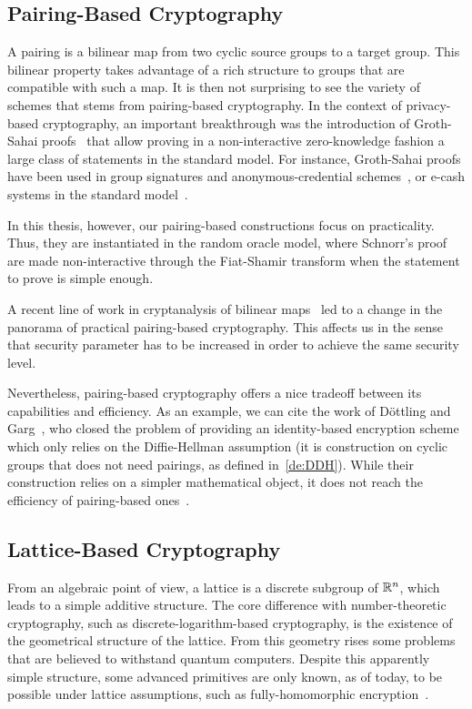 \subsection{Pairing-Based Cryptography}

A pairing is a bilinear map from two cyclic source groups to a target group.
This bilinear property takes advantage of a rich structure to groups that are compatible with such a map.
It is then not surprising to see the variety of schemes that stems from pairing-based cryptography.
In the context of privacy-based cryptography, an important breakthrough was the introduction of Groth-Sahai proofs~\cite{GOS06,GS08} that allow proving in a non-interactive zero-knowledge fashion a large class of statements in the standard model.
For instance, Groth-Sahai proofs have been used in group signatures and anonymous-credential schemes~\cite{Gro07,BCKL08,BCC+09}, or e-cash systems in the standard model~\cite{BCKL09}.

In this thesis, however, our pairing-based constructions focus on practicality.
Thus, they are instantiated in the random oracle model, where Schnorr's proof are made non-interactive through the Fiat-Shamir transform when the statement to prove is simple enough.

A recent line of work in cryptanalysis of bilinear maps~\cite{KB16,MSS17,BD18} led to a change in the panorama of practical pairing-based cryptography.
This affects us in the sense that security parameter has to be increased in order to achieve the same security level.

Nevertheless, pairing-based cryptography offers a nice tradeoff between its capabilities and efficiency.
As an example, we can cite the work of Döttling and Garg~\cite{DG17}, who closed the problem of providing an identity-based encryption scheme which only relies on the Diffie-Hellman assumption (it is construction on cyclic groups that does not need pairings, as defined in~\cref{de:DDH}).
While their construction relies on a simpler mathematical object, it does not reach the efficiency of pairing-based ones~\cite{BB04}.

\subsection{Lattice-Based Cryptography}

From an algebraic point of view, a lattice is a discrete subgroup of $\mathbb{R}^n$,
which leads to a simple additive structure.
The core difference with number-theoretic cryptography, such as discrete-logarithm-based cryptography, is the existence of the geometrical structure of the lattice.
From this geometry rises some problems that are believed to withstand quantum computers.
Despite this apparently simple structure, some advanced primitives are only known, as of today, to be possible under lattice assumptions, such as fully-homomorphic encryption~\cite{Gen09,BV11,GSW13}.

